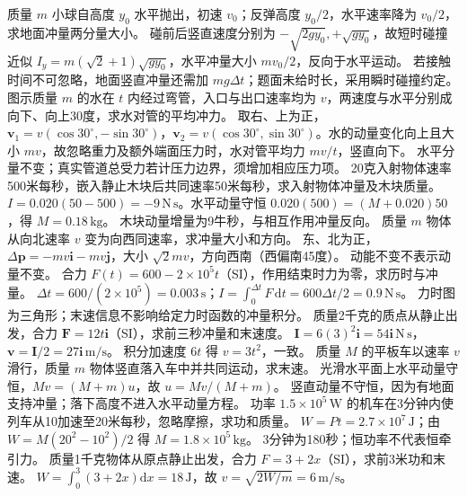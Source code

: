\problemtext 质量 $m$ 小球自高度 $y_0$ 水平抛出，初速 $v_0$；反弹高度 $y_0/2$，水平速率降为 $v_0/2$，求地面冲量两分量大小。
\workings 碰前后竖直速度分别为 $-\sqrt{2gy_0},+\sqrt{gy_0}$，故短时碰撞近似 $I_y=m(\sqrt2+1)\sqrt{gy_0}$，水平冲量大小 $mv_0/2$，反向于水平运动。
\crosscheck 若接触时间不可忽略，地面竖直冲量还需加 $mg\Delta t$；题面未给时长，采用瞬时碰撞约定。
\problemtext 图示质量 $m$ 的水在 $t$ 内经过弯管，入口与出口速率均为 $v$，两速度与水平分别成向下、向上30度，求水对管的平均冲力。
\workings 取右、上为正，$\bm v_1=v(\cos30^\circ,-\sin30^\circ)$，$\bm v_2=v(\cos30^\circ,\sin30^\circ)$。水的动量变化向上且大小 $mv$，故忽略重力及额外端面压力时，水对管平均力 $mv/t$，竖直向下。
\crosscheck 水平分量不变；真实管道总受力若计压力边界，须增加相应压力项。
\problemtext 20克入射物体速率500米每秒，嵌入静止木块后共同速率50米每秒，求入射物体冲量及木块质量。
\workings $I=0.020(50-500)=-9\,\mathrm{N\,s}$。水平动量守恒 $0.020(500)=(M+0.020)50$，得 $M=0.18\,\mathrm{kg}$。
\crosscheck 木块动量增量为9牛秒，与相互作用冲量反向。
\problemtext 质量 $m$ 物体从向北速率 $v$ 变为向西同速率，求冲量大小和方向。
\workings 东、北为正，$\Delta\bm p=-mv\bm i-mv\bm j$，大小 $\sqrt2mv$，方向西南（西偏南45度）。
\crosscheck 动能不变不表示动量不变。
\problemtext 合力 $F(t)=600-2\times10^5t$（SI），作用结束时力为零，求历时与冲量。
\workings $\Delta t=600/(2\times10^5)=0.003\,\mathrm s$；$I=\int_0^{\Delta t}F\,\mathrm dt=600\Delta t/2=0.9\,\mathrm{N\,s}$。
\crosscheck 力时图为三角形；末速信息不影响给定力时函数的冲量积分。
\problemtext 质量2千克的质点从静止出发，合力 $\bm F=12t\bm i$（SI），求前三秒冲量和末速度。
\workings $\bm I=6(3)^2\bm i=54\bm i\,\mathrm{N\,s}$，$\bm v=\bm I/2=27\bm i\,\mathrm{m/s}$。
\crosscheck 积分加速度 $6t$ 得 $v=3t^2$，一致。
\problemtext 质量 $M$ 的平板车以速率 $v$ 滑行，质量 $m$ 物体竖直落入车中并共同运动，求末速。
\workings 光滑水平面上水平动量守恒，$Mv=(M+m)u$，故 $u=Mv/(M+m)$。
\crosscheck 竖直动量不守恒，因为有地面支持冲量；落下高度不进入水平动量方程。
\problemtext 功率 $1.5\times10^5\,\mathrm W$ 的机车在3分钟内使列车从10加速至20米每秒，忽略摩擦，求功和质量。
\workings $W=Pt=2.7\times10^7\,\mathrm J$；由 $W=M(20^2-10^2)/2$ 得 $M=1.8\times10^5\,\mathrm{kg}$。
\crosscheck 3分钟为180秒；恒功率不代表恒牵引力。
\problemtext 质量1千克物体从原点静止出发，合力 $F=3+2x$（SI），求前3米功和末速。
\workings $W=\int_0^3(3+2x)\mathrm dx=18\,\mathrm J$，故 $v=\sqrt{2W/m}=6\,\mathrm{m/s}$。
